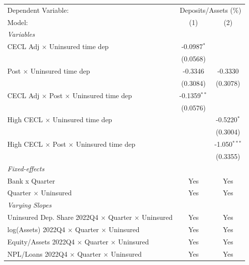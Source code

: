 
\begingroup
\centering
\begin{tabular}{lcc}
   \tabularnewline \midrule \midrule
   Dependent Variable: & \multicolumn{2}{c}{Deposits/Assets (\%)}\\
   Model:                                                       & (1)            & (2)\\  
   \midrule
   \emph{Variables}\\
   CECL Adj $\times$ Uninsured time dep                         & -0.0987$^{*}$  &   \\   
                                                                & (0.0568)       &   \\   
   Post $\times$ Uninsured time dep                             & -0.3346        & -0.3330\\   
                                                                & (0.3084)       & (0.3078)\\   
   CECL Adj $\times$ Post $\times$ Uninsured time dep           & -0.1359$^{**}$ &   \\   
                                                                & (0.0576)       &   \\   
   High CECL $\times$ Uninsured time dep                        &                & -0.5220$^{*}$\\   
                                                                &                & (0.3004)\\   
   High CECL $\times$ Post $\times$ Uninsured time dep          &                & -1.050$^{***}$\\   
                                                                &                & (0.3355)\\   
   \midrule
   \emph{Fixed-effects}\\
   Bank x Quarter                                               & Yes            & Yes\\  
   Quarter $\times$ Uninsured                                   & Yes            & Yes\\
   \midrule
   \emph{Varying Slopes}\\
   Uninsured Dep. Share 2022Q4 $\times$ Quarter $\times$ Uninsured & Yes            & Yes\\
   log(Assets) 2022Q4 $\times$ Quarter $\times$ Uninsured       & Yes            & Yes\\
   Equity/Assets 2022Q4 $\times$ Quarter $\times$ Uninsured     & Yes            & Yes\\
   NPL/Loans 2022Q4 $\times$ Quarter $\times$ Uninsured         & Yes            & Yes\\

\end{tabular}
